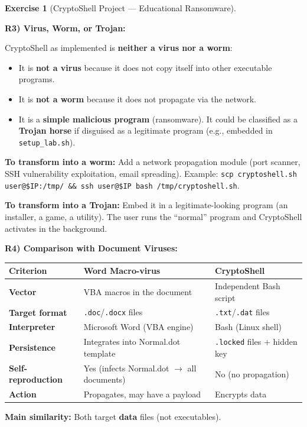 \documentclass[a4paper,11pt]{article}
\theoremstyle{plain}
\theoremstyle{definition}
\newtheorem{exercice}{Exercise}
\begin{document}
\begin{exercice}[CryptoShell Project --- Educational Ransomware]
\begin{correction}
\medskip
\textbf{R3) Virus, Worm, or Trojan:}

CryptoShell as implemented is \textbf{neither a virus nor a worm}:
\begin{itemize}
    \item It is \textbf{not a virus} because it does not copy itself into other executable programs.
    \item It is \textbf{not a worm} because it does not propagate via the network.
    \item It is a \textbf{simple malicious program} (ransomware). It could be classified as a \textbf{Trojan horse} if disguised as a legitimate program (e.g., embedded in \texttt{setup\_lab.sh}).
\end{itemize}

\textbf{To transform into a worm:} Add a network propagation module (port scanner, SSH vulnerability exploitation, email spreading). Example: \texttt{scp cryptoshell.sh user@\$IP:/tmp/ \&\& ssh user@\$IP bash /tmp/cryptoshell.sh}.

\textbf{To transform into a Trojan:} Embed it in a legitimate-looking program (an installer, a game, a utility). The user runs the ``normal'' program and CryptoShell activates in the background.

\medskip
\textbf{R4) Comparison with Document Viruses:}

\begin{center}
\begin{tabular}{lp{4.5cm}p{4.5cm}}
\toprule
\textbf{Criterion} & \textbf{Word Macro-virus} & \textbf{CryptoShell} \\
\midrule
\textbf{Vector} & VBA macros in the document & Independent Bash script \\
\textbf{Target format} & \texttt{.doc}/\texttt{.docx} files & \texttt{.txt}/\texttt{.dat} files \\
\textbf{Interpreter} & Microsoft Word (VBA engine) & Bash (Linux shell) \\
\textbf{Persistence} & Integrates into Normal.dot template & \texttt{.locked} files + hidden key \\
\textbf{Self-reproduction} & Yes (infects Normal.dot $\to$ all documents) & No (no propagation) \\
\textbf{Action} & Propagates, may have a payload & Encrypts data \\
\bottomrule
\end{tabular}
\end{center}

\textbf{Main similarity:} Both target \textbf{data} files (not executables).


\end{correction}
\end{exercice}
\end{document}
